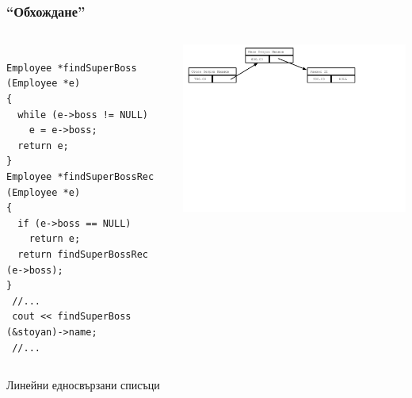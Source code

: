 \documentclass{beamer}
\begin{document}
\begin{frame}[fragile]
\frametitle{``Обхождане''}

\begin{columns}[c]
  \begin{column}{0.55\textwidth}
\begin{flushleft}
\begin{lstlisting}

Employee *findSuperBoss (Employee *e)
{
  while (e->boss != NULL)
    e = e->boss;
  return e;
}
Employee *findSuperBossRec (Employee *e)
{
  if (e->boss == NULL)
    return e;
  return findSuperBossRec (e->boss);
}
 //...
 cout << findSuperBoss (&stoyan)->name;
 //...

\end{lstlisting}  
\end{flushleft}

  \end{column}
  \begin{column}{0.45\textwidth}
\hspace{-150px}
\includegraphics[width=10.5cm]{images/00_rec_obj_three_objects_linked.pdf}

  \end{column}
\end{columns}
\end{frame}



\begin{frame}
\centerline{Линейни едносвързани списъци}
\end{frame}
\end{document}
